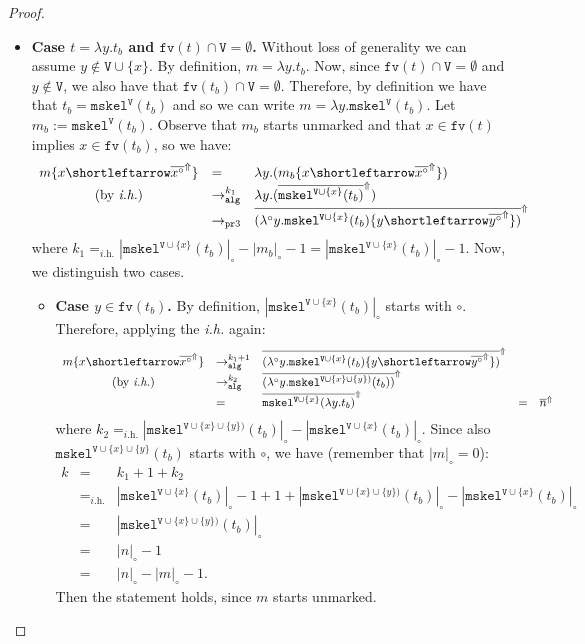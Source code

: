 \documentclass[10pt,a4paper]{article}
\theoremstyle{remark}
\newcommand{\la}[1]{\lambda #1.}
\newcommand{\tm}{t}
\newcommand{\var}{x}
\newcommand{\vartwo}{y}
\newcommand{\Rew}[1]{\rightarrow_{#1}}
\newcommand{\symfont}[1]{\mathtt{#1}}
\newcommand{\defeq}{:=}
\newcommand{\isub}[2]{\{#1{\shortleftarrow}#2\}}
\renewcommand{\l}{\lambda}
\newcommand{\ih}{{\textit{i.h.}}\xspace}
\newcommand{\fv}[1]{\symfont{fv}(#1)}
\newcommand{\set}[1]{\{#1\}}
\newcommand{\sizep}[2]{|#1|_{#2}}
\newcommand{\case}[1]{{\bf Case #1.}}
\newcommand{\taken}{\circ}
\newcommand{\lat}[1]{\l^\taken{#1}.}
\newcommand{\frontiersym}{\Uparrow}
\newcommand{\skelu}[1]{\overline{#1}^{\frontiersym}}
\newcommand{\tomarkblthree}{\Rew{\prsym3}}
\newcommand{\tomark}{\Rew{\symfont{alg}}}
\newcommand{\mtm}{m}
\newcommand{\mtmtwo}{n}
\newcommand{\disc}[2]{\symfont{disc}^{#2}(#1)}
\renewcommand{\disc}[2]{\symfont{mskel}^{#2}(#1)}
\newcommand{\skelvars}{\theta}
\renewcommand{\skelvars}{\symfont{V}}
\newcommand{\sizet}[1]{\sizep{#1}{\taken}}
\newcommand{\prsym}{\symfont{pr}}
\begin{document}
\begin{proof}
\begin{itemize}
\item \case{$\tm = \la\vartwo\tm_b$ and $\fv{\tm} \cap \skelvars = \emptyset$} Without loss of generality we can assume $\vartwo \notin \skelvars \cup \{\var\}$. By definition,
$\mtm = \la\vartwo\tm_b$. Now, since $\fv{\tm} \cap \skelvars = \emptyset$ and $\vartwo \notin \skelvars$, we also have that $\fv{\tm_b} \cap \skelvars = \emptyset$. Therefore, by definition we have that $\tm_b = \disc{\tm_b}\skelvars$ and so we can write
$\mtm = \la\vartwo\disc{\tm_b}\skelvars$. Let $\mtm_b \defeq \disc{\tm_b}\skelvars$. Observe that $\mtm_b$ starts unmarked and that $\var\in\fv\tm$ implies $\var\in\fv{\tm_b}$, so we have:
\[\begin{array}{cllllll}
\mtm\isub\var{\skelu{\var^\taken}}
&= & 
 \la\vartwo(\mtm_b\isub\var{\skelu{\var^\taken}}) 
\\
\mbox{(by \ih)} &\tomark^{k_1} & 
 \la\vartwo(\skelu{\disc{\tm_b}{\skelvars\cup\set\var}}) 
\\
&\tomarkblthree & \skelu{(\lat\vartwo\disc{\tm_b}{\skelvars\cup\set\var}\isub\vartwo{\skelu{\vartwo^\taken}})}
\end{array}\]
where $k_1 =_{\ih} \sizet{\disc{\tm_b}{\skelvars\cup\set\var}} - \sizet{\mtm_b} -1 = \sizet{\disc{\tm_b}{\skelvars\cup\set\var}}  -1$.
Now, we distinguish two cases.
\begin{itemize}
\item \case{$\vartwo \in \fv{{\tm_b}}$} By definition, $\sizet{\disc{\tm_b}{\skelvars \cup \{\var\}}}$ starts with $\taken$. Therefore, applying the \ih again:
\[\begin{array}{cllllll}
\mtm\isub\var{\skelu{\var^\taken}}
&\tomark^{k_1 + 1} &\skelu{(\lat\vartwo\disc{\tm_b}{\skelvars\cup\set\var}\isub\vartwo{\skelu{\vartwo^\taken}})}
\\
\mbox{(by \ih)} &\tomark^{k_2} &
\skelu{(\lat\vartwo\disc{\tm_b}{\skelvars \cup \{\var\} \cup \{\vartwo\})})} 
\\
&= & 
\skelu{\disc{\la\vartwo{\tm_b}}{\skelvars \cup \{\var\}}} 
&= & 
\skelu{\mtmtwo}
\end{array}\]
where $k_2 =_{\ih} \sizet{\disc{\tm_b}{\skelvars \cup \{\var\} \cup \{\vartwo\})}} - \sizet{\disc{\tm_b}{\skelvars \cup \{\var\}}}$.
Since also $\disc{\tm_b}{\skelvars\cup\{\var\}\cup\{\vartwo\}}$ starts with $\taken$, we have (remember that $\sizet{\mtm}=0$):
\[\begin{array}{lllllll}
k&=&k_1+1+k_2
\\
& =_{\ih} & \sizet{\disc{\tm_b}{\skelvars\cup\set\var}} -1 + 1 + \sizet{\disc{\tm_b}{\skelvars \cup \{\var\} \cup \{\vartwo\})}} - \sizet{\disc{\tm_b}{\skelvars \cup \{\var\}}}
\\
& = & 
\sizet{\disc{\tm_b}{\skelvars \cup \{\var\} \cup \{\vartwo\})}} 
\\
& = & 
\sizet{\mtmtwo} -1
\\
& = & 
\sizet{\mtmtwo} - \sizet{\mtm} -1.
\end{array}\]
Then the statement holds, since $\mtm$ starts unmarked.



\end{itemize}
\end{itemize}
\end{proof}
\end{document}
